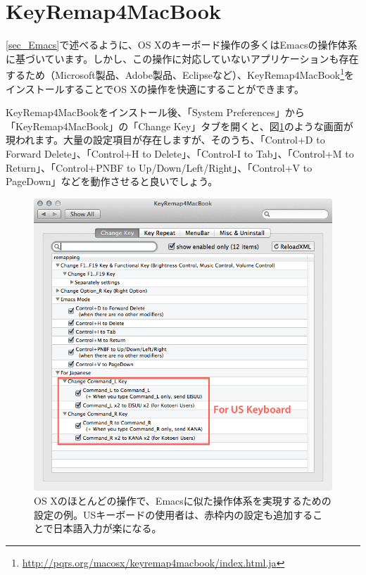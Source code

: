 \section{KeyRemap4MacBook}
\label{sec_KeyRemap4MacBook}

\ref{sec_Emacs}で述べるように、OS Xのキーボード操作の多くはEmacsの操作体系に基づいています。しかし、この操作に対応していないアプリケーションも存在するため（Microsoft製品、Adobe製品、Eclipseなど）、KeyRemap4MacBook\footnote{\url{http://pqrs.org/macosx/keyremap4macbook/index.html.ja}}をインストールすることでOS Xの操作を快適にすることができます。

KeyRemap4MacBookをインストール後、「System Preferences」から「KeyRemap4MacBook」の「Change Key」タブを開くと、図\ref{fig_KeyRemap4MacBook1_png}のような画面が現われます。大量の設定項目が存在しますが、そのうち、「Control+D to Forward Delete」、「Control+H to Delete」、「Control-I to Tab」、「Control+M to Return」、「Control+PNBF to Up/Down/Left/Right」、「Control+V to PageDown」などを動作させると良いでしょう。

\begin{figure}
  \begin{center}
    \includegraphics[scale=0.35,bb= 0 0 668 655]{fig/KeyRemap4MacBook1.png}
    \caption{OS Xのほとんどの操作で、Emacsに似た操作体系を実現するための設定の例。USキーボードの使用者は、赤枠内の設定も追加することで日本語入力が楽になる。}
    \label{fig_KeyRemap4MacBook1_png}
  \end{center}
\end{figure}

